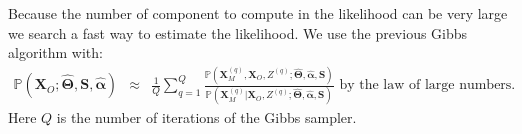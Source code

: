 \documentclass[12pt,a4paper]{report}
\begin{document}
%	
	Because the number of component to compute in the likelihood can be very large we search a fast way to estimate the likelihood.
%	
	 We use the previous Gibbs algorithm with:
	\begin{eqnarray}
	\mathbb{P}(\boldsymbol{X}_O;\hat{\boldsymbol{\Theta}}, \boldsymbol{S}, \hat{\boldsymbol{\alpha}})&\approx & \frac{1}{Q} \sum_{q=1}^Q
	\frac{\mathbb{P}(\boldsymbol{X}_M^{(q)},\boldsymbol{X}_O,Z^{(q)};\hat{\boldsymbol{\Theta}},\hat{\boldsymbol{\alpha}},\boldsymbol{S})}
	{\mathbb{P}(\boldsymbol{X}_M^{(q)}|\boldsymbol{X}_O,Z^{(q)};\hat{\boldsymbol{\Theta}},\hat{\boldsymbol{\alpha}},\boldsymbol{S})} \textrm{ by the law of large numbers. } \ \ \ \nonumber
	\end{eqnarray}	
	Here $Q$ is the number of iterations of the Gibbs sampler.%
\end{document}

